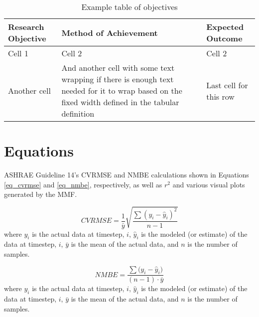 \begin{table}[H]
  \centering
  \caption{Example table of objectives}
  \begin{tabular}{|L{4.5cm}|L{5.5cm}|L{5.0cm}|}
    \hline
    \textbf{Research Objective}                                                                                                                       & \textbf{Method of Achievement} & \textbf{Expected Outcome} \\ \hline \hline
    Cell 1                                                                                                                                            & Cell 2                         & Cell 2                    \\ \hline
    Another cell                                                                                                                                      &
    And another cell with some text wrapping if there is enough text needed for it to wrap based on the fixed width defined in the tabular definition &
    Last cell for this row                                                                                                                                                                                         \\ \hline
  \end{tabular}
  \label{tbl_example}
\end{table}

\section{Equations}

ASHRAE Guideline 14's \cite{Landsberg2014} \gls{CVRMSE} and \gls{NMBE} calculations shown in Equations \ref{eq_cvrmse} and \ref{eq_nmbe}, respectively, as well as $r^2$ and various visual plots generated by the \gls{MMF}.

\begin{equation}
  \label{eq_cvrmse}
  CVRMSE=\frac{1}{\bar{y}}\sqrt{\frac{\sum{(y_i-\hat{y}_i)^2}}{n-1}}
\end{equation}
where $y_i$ is the actual data at timestep, $i$, $\hat{y}_i$ is the modeled (or estimate) of the data at timestep, $i$, $\bar{y}$ is the mean of the actual data, and $n$ is the number of samples.

\bigskip

\begin{equation}
  \label{eq_nmbe}
  NMBE=\frac{\sum{(y_i - \hat{y}_i})}{(n-1) \cdot \bar{y}}
\end{equation}
where $y_i$ is the actual data at timestep, $i$, $\hat{y}_i$ is the modeled (or estimate) of the data at timestep, $i$, $\bar{y}$ is the mean of the actual data, and $n$ is the number of samples.


